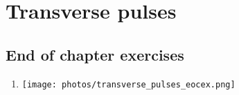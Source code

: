 \section{Transverse pulses}
% 

\subsection{End of chapter exercises} 

\begin{enumerate}[noitemsep, label=\textbf{\arabic*}. ] 
\item %
\texttt{[image: photos/transverse\_pulses\_eocex.png]}
\end{enumerate}


